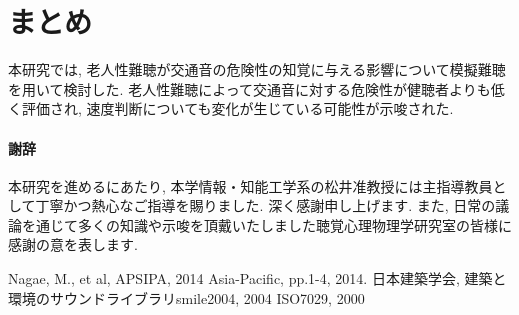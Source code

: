 \documentclass[10pt,twocolumn,uplatex,dvipdfmx]{jsarticle} %
\begin{document}


\section{まとめ}

本研究では, 老人性難聴が交通音の危険性の知覚に与える影響について模擬難聴を用いて検討した. 老人性難聴によって交通音に対する危険性が健聴者よりも低く評価され, 速度判断についても変化が生じている可能性が示唆された.

\paragraph{謝辞}

本研究を進めるにあたり, 本学情報・知能工学系の松井准教授には主指導教員として丁寧かつ熱心なご指導を賜りました. 深く感謝申し上げます. また, 日常の議論を通じて多くの知識や示唆を頂戴いたしました聴覚心理物理学研究室の皆様に感謝の意を表します.


\begin{thebibliography}{9} %
\itemsep -5pt             %
 Nagae, M., et al, APSIPA, 2014 Asia-Pacific, pp.1-4, 2014.
 日本建築学会, 建築と環境のサウンドライブラリsmile2004, 2004
 ISO7029, 2000
\end{thebibliography}
\end{document}
